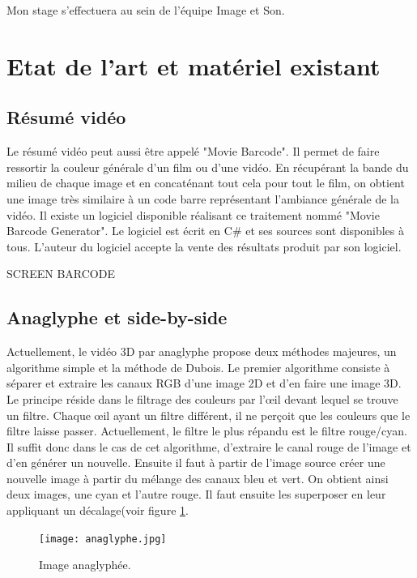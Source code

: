 \documentclass[10pt,a4paper]{article}
\begin{document}
Mon stage s'effectuera au sein de l'équipe Image et Son.

\section{Etat de l'art et matériel existant}
\subsection{Résumé vidéo}
Le résumé vidéo peut aussi être appelé "Movie Barcode". Il permet de faire ressortir la couleur générale d'un film ou d'une vidéo. En récupérant la bande du milieu de chaque image et en concaténant tout cela pour
tout le film, on obtient une image très similaire à un code barre représentant l'ambiance générale de la vidéo.
Il existe un logiciel disponible réalisant ce traitement nommé "Movie Barcode Generator". Le logiciel est écrit en C\# et ses sources sont disponibles à tous\cite{barcode}. L'auteur du logiciel accepte la vente des résultats produit par son logiciel.

SCREEN BARCODE

\subsection{Anaglyphe et side-by-side}
\label{anasbs}
Actuellement, le vidéo 3D par anaglyphe propose deux méthodes majeures, un algorithme simple et la méthode de Dubois.
Le premier algorithme consiste à séparer et extraire les canaux RGB d'une image 2D et d'en faire une image 3D. Le principe réside dans le filtrage des couleurs par l'œil devant lequel se trouve un filtre.
Chaque œil ayant un filtre différent, il ne perçoit que les couleurs que le filtre laisse passer. Actuellement, le filtre le plus répandu est le filtre rouge/cyan.
Il suffit donc dans le cas de cet algorithme, d'extraire le canal rouge de l'image et d'en générer un nouvelle. Ensuite il faut à partir de l'image source créer une nouvelle image à partir du mélange des canaux bleu et vert.
On obtient ainsi deux images, une cyan et l'autre rouge. Il faut ensuite les superposer en leur appliquant un décalage(voir figure \ref{anaglyphe}.\newline

\begin{figure}[!h]
\center
\texttt{[image: anaglyphe.jpg]}
\caption{Image anaglyphée.}
\label{anaglyphe}
\end{figure}
\end{document}
